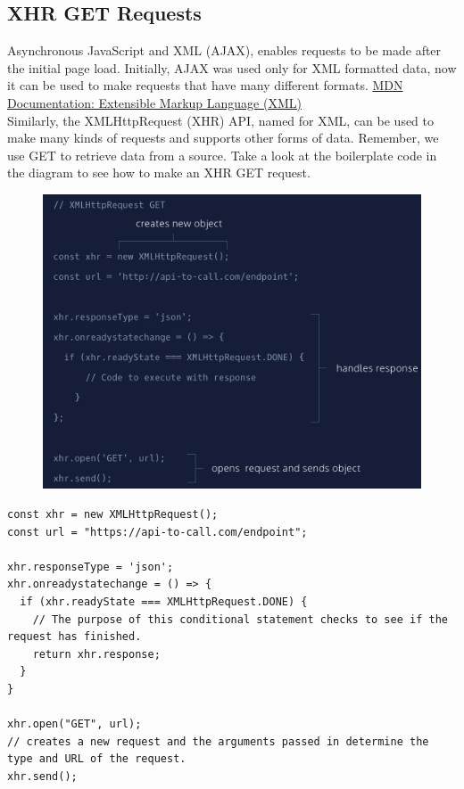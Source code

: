 \documentclass[11pt]{article}
\begin{document}
\subsection{XHR GET Requests}
Asynchronous JavaScript and XML (AJAX), enables requests to be made after the initial page load. Initially, AJAX was used only for XML formatted data, now it can be used to make requests that have many different formats. \href{https://developer.mozilla.org/en-US/docs/Web/XML/XML_introduction}{MDN Documentation: Extensible Markup Language (XML)} \\
\newline
Similarly, the XMLHttpRequest (XHR) API, named for XML, can be used to make many kinds of requests and supports other forms of data. Remember, we use GET to retrieve data from a source. Take a look at the boilerplate code in the diagram to see how to make an XHR GET request.
\begin{figure}[H]
\includegraphics[scale = 0.43]{17_1}
\centering
\end{figure}
\begin{lstlisting}
const xhr = new XMLHttpRequest(); 
const url = "https://api-to-call.com/endpoint";

xhr.responseType = 'json'; 
xhr.onreadystatechange = () => {
  if (xhr.readyState === XMLHttpRequest.DONE) {
    // The purpose of this conditional statement checks to see if the request has finished.
    return xhr.response; 
  }
}

xhr.open("GET", url); 
// creates a new request and the arguments passed in determine the type and URL of the request.
xhr.send(); 
\end{lstlisting}
\end{document}
